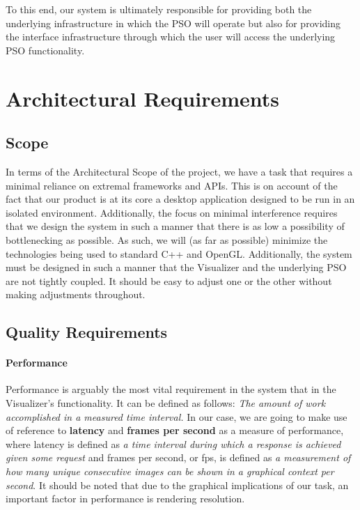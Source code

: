 \documentclass[11pt]{article}
\begin{document}
To this end, our system is ultimately responsible for providing both the underlying infrastructure in which the PSO will operate but also for providing the interface infrastructure through which the user will access the underlying PSO functionality.


\section{Architectural Requirements}
\subsection{Scope}
In terms of the Architectural Scope of the project, we have a task that requires a minimal reliance on extremal frameworks and APIs. This is on account of the fact that our product is at its core a desktop application designed to be run in an isolated environment. Additionally, the focus on minimal interference requires that we design the system in such a manner that there is as low a possibility of bottlenecking as possible. As such, we will (as far as possible) minimize the technologies being used to standard C++ and OpenGL. Additionally, the system must be designed in such a manner that the Visualizer and the underlying PSO are not tightly coupled. It should be easy to adjust one or the other without making adjustments throughout.
\subsection{Quality Requirements}
\paragraph{Performance}
Performance is arguably the most vital requirement in the system that in the Visualizer's functionality. It can be defined as follows:
\newline\textit{The amount of work accomplished in a measured time interval.}
\newline In our case, we are going to make use of reference to \textbf{latency} and \textbf{frames per second} as a measure of performance, where latency is defined as \textit{a time interval during which a response is achieved given some request} and frames per second, or fps, is defined as \textit{a measurement of how many unique consecutive images can be shown in a graphical context per second}. It should be noted that due to the graphical implications of our task, an important factor in performance is rendering resolution.
\end{document}
